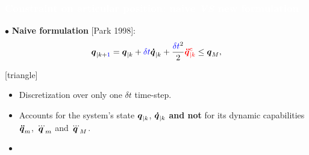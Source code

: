 \begin{frame}
\frametitle{{\textcolor{white}{Constraint on articular position: naive \textit{VS} new formulation}}}
\hspace{-5mm}
$\bullet$ {\color{black}\textbf{Naive formulation}} [Park 1998]:
\begin{equation}
\mbox{\boldmath${q}$}_{|k+\textcolor{blue}{1}} = \mbox{\boldmath${q}$}_{|k} + \textcolor{blue}{\delta t} \mbox{\boldmath${\dot{q}}$}_{|k} + \frac{\textcolor{blue}{\delta t}^{2}}{2} \textcolor{red}{\mbox{\boldmath${\ddot{q}}$}_{|k}^{c}} \leq \mbox{\boldmath${q}$}_{M},
\end{equation}

[triangle]
\begin{itemize}
\addtolength{\itemindent}{3mm}
\item Discretization over only {\color{blue}one $\delta t$} time-step.
\setlength\itemsep{-0.1em} 
\item Accounts for the system's state $\mbox{\boldmath${q}$}_{|k}$, $\mbox{\boldmath${\dot{q}}$}_{|k}$ \textbf{{\color{red}and not}} for its dynamic capabilities {\color{blue-violet}$\mbox{\boldmath${\ddot{q}}$}_{m}$}, {\color{blue-violet}$\mbox{\boldmath${\dddot{q}}$}_{m}$} and {\color{blue-violet}$\mbox{\boldmath${\dddot{q}}$}_{M}$}.
\end{itemize}

\vspace{0mm}
\begin{itemize}
\addtolength{\itemindent}{-1mm}
\item[\hookrightarrow] 
\end{itemize}
\vspace{5mm}
\hspace{-5mm}





\end{frame}
